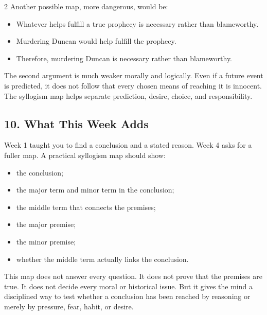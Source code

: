 \documentclass[12pt]{article}
\begin{document}
\begin{multicols}{2}
Another possible map, more dangerous, would be:

\begin{itemize}[leftmargin=*]
\item Whatever helps fulfill a true prophecy is necessary rather than blameworthy.
\item Murdering Duncan would help fulfill the prophecy.
\item Therefore, murdering Duncan is necessary rather than blameworthy.
\end{itemize}

The second argument is much weaker morally and logically. Even if a future event is predicted, it does not follow that every chosen means of reaching it is innocent. The syllogism map helps separate prediction, desire, choice, and responsibility.

\subsection*{10. What This Week Adds}
Week 1 taught you to find a conclusion and a stated reason. Week 4 asks for a fuller map. A practical syllogism map should show:

\begin{itemize}[leftmargin=*]
\item the conclusion;
\item the major term and minor term in the conclusion;
\item the middle term that connects the premises;
\item the major premise;
\item the minor premise;
\item whether the middle term actually links the conclusion.
\end{itemize}

This map does not answer every question. It does not prove that the premises are true. It does not decide every moral or historical issue. But it gives the mind a disciplined way to test whether a conclusion has been reached by reasoning or merely by pressure, fear, habit, or desire.


\end{multicols}
\end{document}
